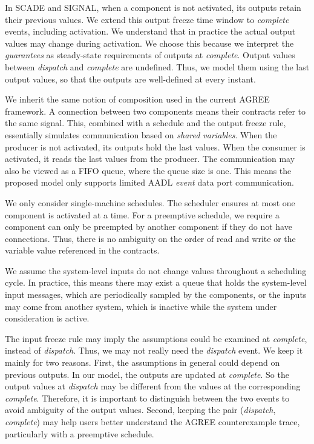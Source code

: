 In SCADE and SIGNAL, when a component is not activated, its outputs retain their previous values. We extend this output freeze time window to \emph{complete} events, including activation. We understand that in practice the actual output values may change during activation. We choose this because we interpret the \emph{guarantees} as steady-state requirements of outputs at \emph{complete}. Output values between \textit{dispatch} and \textit{complete} are undefined. Thus, we model them using the last output values, so that the outputs are well-defined at every instant.

We inherit the same notion of composition used in the current AGREE framework. A connection between two components means their contracts refer to the same signal. 
This, combined with a schedule and the output freeze rule, essentially simulates communication based on \emph{shared variables}. When the producer is not activated, its outputs hold the last values. When the consumer is activated, it reads the last values from the producer. The communication may also be viewed as a FIFO queue, where the queue size is one. %
This means the proposed model only supports limited AADL \textit{event} data port communication.

We only consider single-machine schedules. The scheduler ensures at most one component is activated at a time. For a preemptive schedule, we require a component can only be preempted by another component if they do not have connections. Thus, there is no ambiguity on the order of read and write or the variable value referenced in the contracts.

We assume the system-level inputs do not change values throughout a scheduling cycle. In practice, this means there may exist a queue that holds the system-level input messages, which are periodically sampled by the components, or the inputs may come from another system, which is inactive while the system under consideration is active.

The input freeze rule may imply the assumptions could be examined at \emph{complete}, instead of \emph{dispatch}. Thus, we may not really need the \emph{dispatch} event. We keep it mainly for two reasons. First, the assumptions in general could depend on previous outputs. In our model, the outputs are updated at \emph{complete}. So the output values at \emph{dispatch} may be different from the values at the corresponding \emph{complete}. Therefore, it is important to distinguish between the two events to avoid ambiguity of the output values. Second, keeping the pair (\emph{dispatch}, \emph{complete}) may help users better understand the AGREE counterexample trace, particularly with a preemptive schedule.

